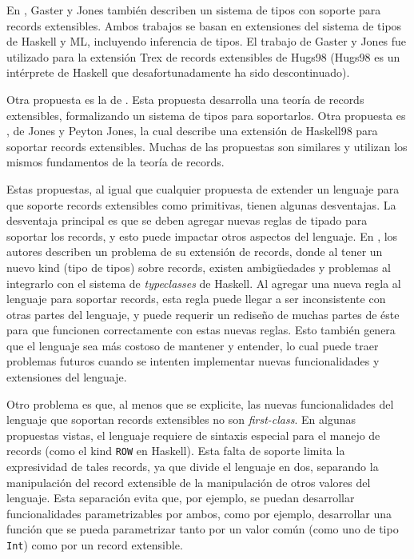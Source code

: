 En \cite{Gaster96apolymorphic}, Gaster y Jones también describen un sistema de tipos con soporte para records extensibles. Ambos trabajos se basan en extensiones del sistema de tipos de Haskell y ML, incluyendo inferencia de tipos. El trabajo de Gaster y Jones fue utilizado para la extensión Trex de records extensibles de Hugs98 \cite{TrexHugsExtension} (Hugs98 es un intérprete de Haskell que desafortunadamente ha sido descontinuado).

Otra propuesta es la de \cite{Cardelli:1990:OR:101514.101515}. Esta propuesta desarrolla una teoría de records extensibles, formalizando un sistema de tipos para soportarlos. Otra propuesta es \cite{Jones99lightweightextensible}, de Jones y Peyton Jones, la cual describe una extensión de Haskell98 para soportar records extensibles. Muchas de las propuestas son similares y utilizan los mismos fundamentos de la teoría de records.

Estas propuestas, al igual que cualquier propuesta de extender un lenguaje para que soporte records extensibles como primitivas, tienen algunas desventajas. La desventaja principal es que se deben agregar nuevas reglas de tipado para soportar los records, y esto puede impactar otros aspectos del lenguaje. En \cite{Jones99lightweightextensible}, los autores describen un problema de su extensión de records, donde al tener un nuevo kind (tipo de tipos) sobre records, existen ambigüedades y problemas al integrarlo con el sistema de \textit{typeclasses} de Haskell. Al agregar una nueva regla al lenguaje para soportar records, esta regla puede llegar a ser inconsistente con otras partes del lenguaje, y puede requerir un rediseño de muchas partes de éste para que funcionen correctamente con estas nuevas reglas. Esto también genera que el lenguaje sea más costoso de mantener y entender, lo cual puede traer problemas futuros cuando se intenten implementar nuevas funcionalidades y extensiones del lenguaje. 

Otro problema es que, al menos que se explicite, las nuevas funcionalidades del lenguaje que soportan records extensibles no son \textit{first-class}. En algunas propuestas vistas, el lenguaje requiere de sintaxis especial para el manejo de records (como el kind \texttt{ROW} en Haskell). Esta falta de soporte limita la expresividad de tales records, ya que divide el lenguaje en dos, separando la manipulación del record extensible de la manipulación de otros valores del lenguaje. Esta separación evita que, por ejemplo, se puedan desarrollar funcionalidades parametrizables por ambos, como por ejemplo, desarrollar una función que se pueda parametrizar tanto por un valor común (como uno de tipo \texttt{Int}) como por un record extensible.

